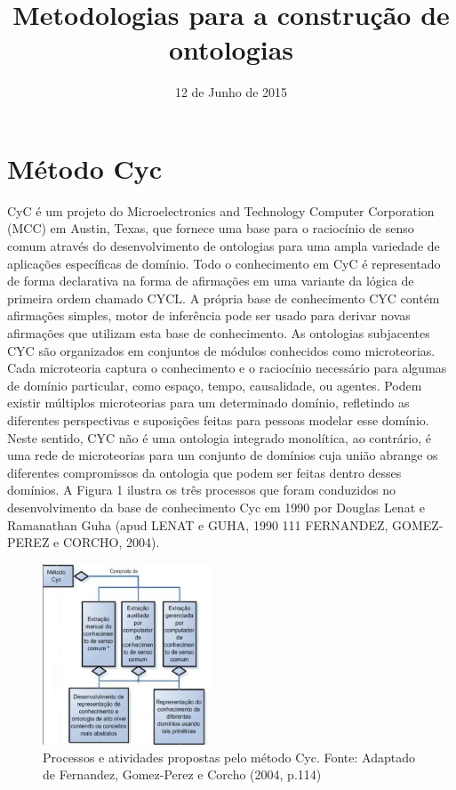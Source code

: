 \documentclass[a4paper]{report}
\title{Metodologias para a construção de ontologias}
\date{12 de Junho de 2015} %
\begin{document}
\pagestyle{plain}
\maketitle

\section{Método Cyc} 

\qquad CyC  é um projeto do Microelectronics and Technology Computer Corporation (MCC) em Austin, Texas, que fornece uma base para o raciocínio de senso comum através do desenvolvimento de ontologias para uma ampla variedade de aplicações específicas de domínio. Todo o conhecimento em CyC é representado de forma declarativa na forma de afirmações em uma variante da lógica de primeira ordem chamado CYCL. A própria base de conhecimento CYC contém afirmações simples, motor de inferência pode ser usado para derivar novas afirmações que utilizam esta base de conhecimento.
As ontologias subjacentes CYC são organizados em conjuntos de módulos conhecidos como microteorias. Cada microteoria captura o conhecimento e o raciocínio necessário para algumas de domínio particular, como espaço, tempo, causalidade, ou agentes. Podem existir múltiplos microteorias para um determinado domínio, refletindo as diferentes perspectivas e suposições feitas para pessoas modelar esse domínio. Neste sentido, CYC não é uma ontologia integrado monolítica, ao contrário, é uma rede de microteorias para um conjunto de domínios cuja união abrange os diferentes compromissos da ontologia que podem ser feitas dentro desses domínios.
	A Figura 1 ilustra os três processos que foram conduzidos no desenvolvimento da
base de conhecimento Cyc em 1990 por Douglas Lenat e Ramanathan Guha (apud LENAT e GUHA, 1990 111 FERNANDEZ, GOMEZ-PEREZ e CORCHO, 2004).

\begin{figure}[h] 
\centering %
\includegraphics[width=5cm]{Figuras/1.png} %
\caption{Processos e atividades propostas pelo método Cyc. 
Fonte: Adaptado de Fernandez, Gomez-Perez e Corcho (2004, p.114)}
\end{figure}
\end{document}
